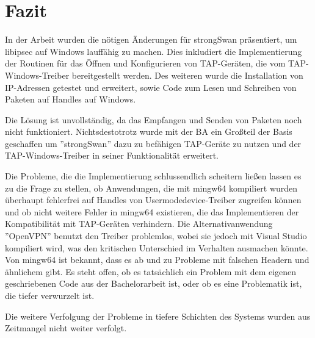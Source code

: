 



\section{Fazit}

In der Arbeit wurden die nötigen Änderungen für strongSwan präsentiert, um
libipsec auf Windows lauffähig zu machen. Dies inkludiert die Implementierung
der Routinen für das Öffnen und Konfigurieren von TAP-Geräten, die vom TAP-Windows-Treiber
bereitgestellt werden. Des weiteren wurde die Installation von IP-Adressen getestet
und erweitert, sowie Code zum Lesen und Schreiben von Paketen auf Handles auf Windows.

Die Lösung ist unvollständig, da das Empfangen und Senden von Paketen noch nicht funktioniert.
Nichtsdestotrotz wurde mit der \ac{BA} ein Großteil der Basis geschaffen um ''strongSwan''
dazu zu befähigen TAP-Geräte zu nutzen und der TAP-Windows-Treiber in seiner Funktionalität
erweitert.

Die Probleme, die die Implementierung schlussendlich scheitern ließen lassen es zu
die Frage zu stellen, ob Anwendungen, die mit mingw64 kompiliert wurden überhaupt
fehlerfrei auf Handles von Usermodedevice-Treiber zugreifen können und ob
nicht weitere Fehler in mingw64 existieren, die das Implementieren der Kompatibilität
mit TAP-Geräten verhindern. Die Alternativanwendung ''OpenVPN'' benutzt den
Treiber problemlos, wobei sie jedoch mit Visual Studio kompiliert wird,
was den kritischen Unterschied im Verhalten ausmachen könnte.
Von mingw64 ist bekannt, dass es ab und zu Probleme mit falschen Headern und ähnlichem
gibt. Es steht offen, ob es tatsächlich ein Problem mit dem eigenen geschriebenen Code
aus der Bachelorarbeit ist, oder ob es eine Problematik ist, die tiefer verwurzelt ist.

Die weitere Verfolgung der Probleme in tiefere Schichten des Systems wurden aus
Zeitmangel nicht weiter verfolgt.
